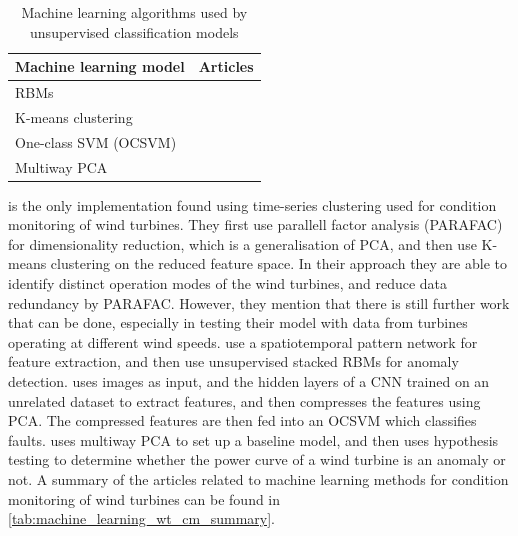 \begin{table}[h]
    \centering
    \begin{tabular}{p{}p{}}
        \toprule
        Machine learning model & Articles \\
        \midrule
        RBMs                    & \cite{unsup_graphical_modeling_wt_cm} \\
        K-means clustering      & \cite{fault_detect_PARAFAC_k_means} \\
        One-class SVM (OCSVM)   & \cite{unsupervised_AD_blade_damage_deep_features_images} \\
        Multiway PCA            & \cite{multiway_PCA_multivar_inference_cm_wt} \\
        \bottomrule
    \end{tabular}
    \caption{Machine learning algorithms used by unsupervised classification models}
    \label{tab:sup_classification_ml_models}
\end{table}

\textcite{fault_detect_PARAFAC_k_means} is the only implementation found using time-series clustering used for condition monitoring of wind turbines. 
They first use parallell factor analysis (PARAFAC) for dimensionality reduction, which is a generalisation of PCA, and then use K-means clustering on the reduced feature space. 
In their approach they are able to identify distinct operation modes of the wind turbines, and reduce data redundancy by PARAFAC. 
However, they mention that there is still further work that can be done, especially in testing their model with data from turbines operating at different wind speeds. 
\textcite{unsup_graphical_modeling_wt_cm} use a spatiotemporal pattern network for feature extraction, and then use unsupervised stacked RBMs for anomaly detection. 
\textcite{unsupervised_AD_blade_damage_deep_features_images} uses images as input, and the hidden layers of a CNN trained on an unrelated dataset to extract features, and then compresses the features using PCA. 
The compressed features are then fed into an OCSVM which classifies faults. 
\textcite{multiway_PCA_multivar_inference_cm_wt} uses multiway PCA to set up a baseline model, and then uses hypothesis testing to determine whether the power curve of a wind turbine is an anomaly or not. 
A summary of the articles related to machine learning methods for condition monitoring of wind turbines can be found in \ref{tab:machine_learning_wt_cm_summary}.

